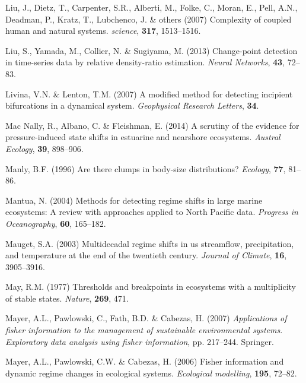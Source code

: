 \documentclass[12pt,twoside,openany]{reedthesis}
\begin{document}
\leavevmode\hypertarget{ref-liu_complexity_2007}{}%
Liu, J., Dietz, T., Carpenter, S.R., Alberti, M., Folke, C., Moran, E., Pell, A.N., Deadman, P., Kratz, T., Lubchenco, J. \& others (2007) Complexity of coupled human and natural systems. \emph{science}, \textbf{317}, 1513--1516.

\leavevmode\hypertarget{ref-liu2013change}{}%
Liu, S., Yamada, M., Collier, N. \& Sugiyama, M. (2013) Change-point detection in time-series data by relative density-ratio estimation. \emph{Neural Networks}, \textbf{43}, 72--83.

\leavevmode\hypertarget{ref-livina2007modified}{}%
Livina, V.N. \& Lenton, T.M. (2007) A modified method for detecting incipient bifurcations in a dynamical system. \emph{Geophysical Research Letters}, \textbf{34}.

\leavevmode\hypertarget{ref-mac2014scrutiny}{}%
Mac Nally, R., Albano, C. \& Fleishman, E. (2014) A scrutiny of the evidence for pressure-induced state shifts in estuarine and nearshore ecosystems. \emph{Austral Ecology}, \textbf{39}, 898--906.

\leavevmode\hypertarget{ref-manly1996there}{}%
Manly, B.F. (1996) Are there clumps in body-size distributions? \emph{Ecology}, \textbf{77}, 81--86.

\leavevmode\hypertarget{ref-mantua_methods_2004}{}%
Mantua, N. (2004) Methods for detecting regime shifts in large marine ecosystems: A review with approaches applied to North Pacific data. \emph{Progress in Oceanography}, \textbf{60}, 165--182.

\leavevmode\hypertarget{ref-mauget2003multidecadal}{}%
Mauget, S.A. (2003) Multidecadal regime shifts in us streamflow, precipitation, and temperature at the end of the twentieth century. \emph{Journal of Climate}, \textbf{16}, 3905--3916.

\leavevmode\hypertarget{ref-may1977thresholds}{}%
May, R.M. (1977) Thresholds and breakpoints in ecosystems with a multiplicity of stable states. \emph{Nature}, \textbf{269}, 471.

\leavevmode\hypertarget{ref-mayer_applications_2007}{}%
Mayer, A.L., Pawlowski, C., Fath, B.D. \& Cabezas, H. (2007) \emph{Applications of fisher information to the management of sustainable environmental systems}. \emph{Exploratory data analysis using fisher information}, pp. 217--244. Springer.

\leavevmode\hypertarget{ref-mayer_fisher_2006}{}%
Mayer, A.L., Pawlowski, C.W. \& Cabezas, H. (2006) Fisher information and dynamic regime changes in ecological systems. \emph{Ecological modelling}, \textbf{195}, 72--82.
\end{document}
